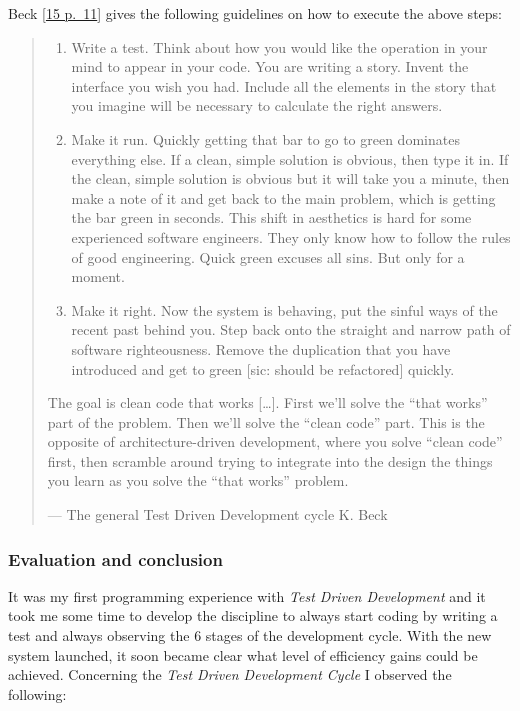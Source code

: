 Beck {[}\protect\hyperlink{beck2003}{15 p.~11}{]} gives the following
guidelines on how to execute the above steps:

\begin{quote}
\begin{enumerate}
\def\labelenumi{\arabic{enumi}.}
\item
  Write a test. Think about how you would like the operation in your
  mind to appear in your code. You are writing a story. Invent the
  interface you wish you had. Include all the elements in the story that
  you imagine will be necessary to calculate the right answers.
\item
  Make it run. Quickly getting that bar to go to green dominates
  everything else. If a clean, simple solution is obvious, then type it
  in. If the clean, simple solution is obvious but it will take you a
  minute, then make a note of it and get back to the main problem, which
  is getting the bar green in se­conds. This shift in aesthetics is hard
  for some experienced software engineers. They only know how to follow
  the rules of good engineering. Quick green excuses all sins. But only
  for a moment.
\item
  Make it right. Now the system is behaving, put the sinful ways of the
  recent past behind you. Step back onto the straight and narrow path of
  software righteousness. Remove the duplication that you have
  introduced and get to green {[}sic: should be refactored{]} quickly.
\end{enumerate}

The goal is clean code that works {[}\ldots{}​{]}. First we'll solve the
``that works'' part of the problem. Then we'll solve the ``clean code''
part. This is the opposite of architecture-driven development, where you
solve ``clean code'' first, then scramble around trying to integrate
into the design the things you learn as you solve the ``that works''
problem.

---  The general Test Driven Development cycle K. Beck
\end{quote}

\subsubsection{Evaluation and
conclusion}\label{_evaluation_and_conclusion}

It was my first programming experience with \emph{Test Driven
Development} and it took me some time to develop the discipline to
always start coding by writing a test and always observing the 6 stages
of the development cycle. With the new system launched, it soon became
clear what level of efficiency gains could be achieved. Concerning the
\emph{Test Driven Development Cycle} I observed the following:

